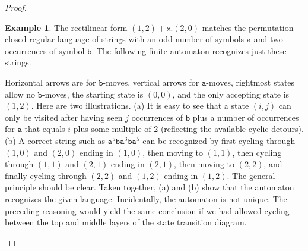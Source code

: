 \documentclass[12pt,oneside,reqno]{amsart}
\theoremstyle{definition}
\newtheorem{example}{Example}
\begin{document}
\begin{proof}
\begin{example}   The rectilinear form $(1, 2) + \mathsf{x}.(2, 0)$ matches the permutation-closed regular language of strings with an odd number of symbols $\mathtt{a}$ and two occurrences of  symbol $\mathtt{b}$. The following  finite automaton recognizes just these strings.
\begin{center}
\end{center}
Horizontal arrows are for $\mathtt{b}$-moves, vertical arrows for $\mathtt{a}$-moves, rightmost states allow no $\mathtt{b}$-moves, the starting state is $(0, 0)$, and the only accepting state is $(1, 2)$. Here are two illustrations. (a) It is easy to see that a state $(i, j)$ can only be visited after having seen $j$ occurrences of  $\mathtt{b}$ plus a number of occurrences for  $\mathtt{a}$ that equals $i$ plus some multiple of 2 (reflecting the available cyclic detours). (b) A correct string such as  $\mathtt{a}^{5} \mathtt{b} \mathtt{a}^{3} \mathtt{b}\mathtt{a}^{5} $ can be recognized by first cycling through $(1, 0)$ and $(2, 0)$ ending in $(1, 0)$, then moving to $(1, 1)$, then cycling through  $(1, 1)$ and $(2, 1)$ ending in $(2,1)$, then moving to $(2, 2)$, and finally cycling through $(2, 2)$ and $(1, 2)$ ending in $(1, 2)$. The general principle should be clear. Taken together, (a) and (b) show that the automaton recognizes the given language. Incidentally, the automaton is not unique. The preceding reasoning would yield the same conclusion if we had allowed cycling between the top and middle layers of the state transition diagram.


\end{example}
\end{proof}
\end{document}
